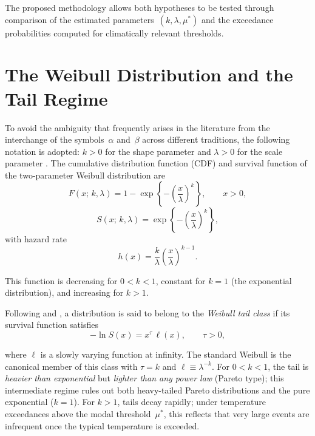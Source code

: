 \documentclass[APA,STIX1COL]{WileyNJD-v2}
\begin{document}
The proposed methodology allows both hypotheses to be tested
through comparison of the estimated parameters~$(k,\lambda,\mu^*)$
and the exceedance probabilities computed for climatically
relevant thresholds.

\section{The Weibull Distribution and the Tail Regime}
\label{sec:weibull}

To avoid the ambiguity that frequently arises in the literature
from the interchange of the symbols~$\alpha$ and~$\beta$ across
different traditions, the following notation is adopted: $k>0$
for the shape parameter and $\lambda>0$ for the scale parameter
\citep[see also][]{makkonen2014}. The cumulative distribution
function (CDF) and survival function of the two-parameter Weibull
distribution are
\begin{equation}\label{eq:fda}
F(x;\,k,\lambda)
  = 1 - \exp\!\left\{-\left(\frac{x}{\lambda}\right)^{\!k}\right\},
  \qquad x > 0,
\end{equation}
\begin{equation}\label{eq:supervivencia}
S(x;\,k,\lambda)
  = \exp\!\left\{-\left(\frac{x}{\lambda}\right)^{\!k}\right\},
\end{equation}
with hazard rate
\begin{equation}\label{eq:hazard}
h(x) = \frac{k}{\lambda}\left(\frac{x}{\lambda}\right)^{k-1}.
\end{equation}

\medskip
This function is decreasing for $0<k<1$, constant for $k=1$
(the exponential distribution), and increasing for $k>1$.

Following \citet{gardes2005} and \citet{diebolt2008}, a
distribution is said to belong to the \emph{Weibull tail class}
if its survival function satisfies
\begin{equation}\label{eq:cola_weibull}
-\ln S(x) = x^\tau\,\ell(x),\qquad \tau>0,
\end{equation}

\medskip

where $\ell$ is a slowly varying function at infinity. The
standard Weibull is the canonical member of this class with
$\tau=k$ and $\ell\equiv\lambda^{-k}$. For $0<k<1$, the tail is
\emph{heavier than exponential} but \emph{lighter than any
power law} (Pareto type); this intermediate regime rules out
both heavy-tailed Pareto distributions and the pure exponential
($k=1$). For $k>1$, tails decay rapidly; under temperature
exceedances above the modal threshold~$\mu^*$, this reflects
that very large events are infrequent once the typical temperature
is exceeded.
\end{document}
